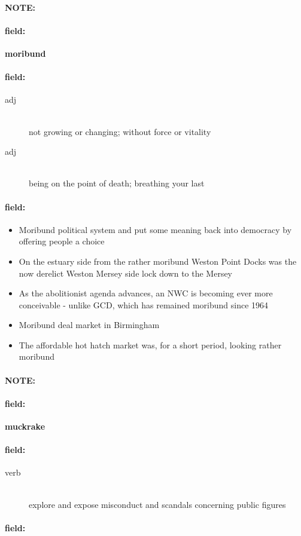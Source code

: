 \documentclass[12pt]{article}
\newenvironment{note}{\paragraph{NOTE:}}{}
\newenvironment{field}{\paragraph{field:}}{}
\begin{document}
\begin{note}
\begin{field}
\textbf{\large moribund}
\end{field}


\begin{field}
\begin{description}
\item[adj] \hfill \\ 
not growing or changing; without force or vitality

\item[adj] \hfill \\ 
being on the point of death; breathing your last

\end{description}
\end{field}

\begin{field}
\begin{itemize}
\item Moribund political system and put some meaning back into democracy by offering people a choice
\item On the estuary side from the rather moribund Weston Point Docks was the now derelict Weston Mersey side lock down to the Mersey
\item As the abolitionist agenda advances, an NWC is becoming ever more conceivable - unlike GCD, which has remained moribund since 1964
\item Moribund deal market in Birmingham
\item The affordable hot hatch market was, for a short period, looking rather moribund
\end{itemize}
\end{field}
\end{note}
\begin{note}
\begin{field}
\textbf{\large muckrake}
\end{field}


\begin{field}
\begin{description}
\item[verb] \hfill \\ 
explore and expose misconduct and scandals concerning public figures

\end{description}
\end{field}

\begin{field}
\end{field}
\end{note}
\end{document}
